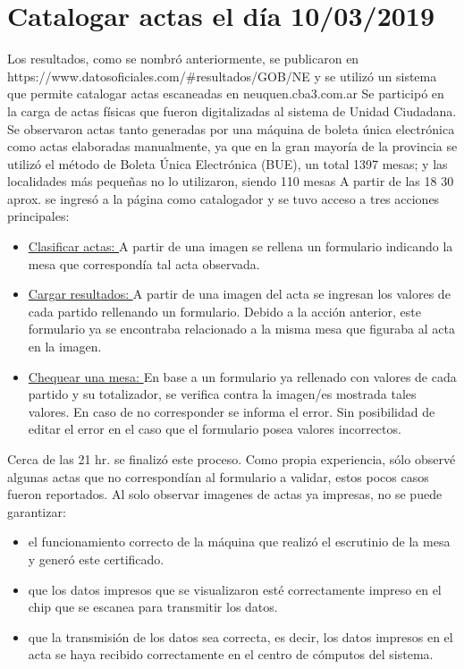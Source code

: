 \section{Catalogar actas el día 10/03/2019}
Los resultados, como se nombró anteriormente, se publicaron en https://www.datosoficiales.com/#resultados/GOB/NE y se utilizó un sistema que permite catalogar actas escaneadas en neuquen.cba3.com.ar \newline
Se participó en la carga de actas físicas que fueron digitalizadas al sistema de Unidad Ciudadana. Se observaron actas tanto generadas por una máquina de boleta única electrónica como actas elaboradas manualmente, ya que en la gran mayoría de la provincia se utilizó el método de Boleta Única Electrónica (BUE), un total 1397 mesas; y las localidades más pequeñas no lo utilizaron, siendo 110 mesas \cite{eleccionesNeuquenBUE} \newline
A partir de las 18 30 aprox. se ingresó a la página como catalogador y se tuvo acceso a tres acciones principales: 

\begin{itemize}
    \item \underline{Clasificar actas: }A partir de una imagen se rellena un formulario indicando la mesa que correspondía tal acta observada.
    \item \underline{Cargar resultados: }A partir de una imagen del acta se ingresan los valores de cada partido rellenando un formulario. Debido a la acción anterior, este formulario ya se encontraba relacionado a la misma mesa que figuraba al acta en la imagen.
    \item \underline{Chequear una mesa: }En base a un formulario ya rellenado con valores de cada partido y su totalizador, se verifica contra la imagen/es mostrada tales valores. En caso de no corresponder se informa el error. Sin posibilidad de editar el error en el caso que el formulario posea valores incorrectos.
\end{itemize}
Cerca de las 21 hr. se finalizó este proceso. Como propia experiencia, sólo observé algunas actas que no correspondían al formulario a validar, estos pocos casos fueron reportados. 
Al solo observar imagenes de actas ya impresas, no se puede garantizar:
\begin{itemize}
    \item el funcionamiento correcto de la máquina que realizó el escrutinio de la mesa y generó este certificado.
    \item que los datos impresos que se visualizaron esté correctamente impreso en el chip que se escanea para transmitir los datos.
    \item que la transmisión de los datos sea correcta, es decir, los datos impresos  en el acta se haya recibido correctamente en el centro de cómputos del sistema.
\end{itemize}

